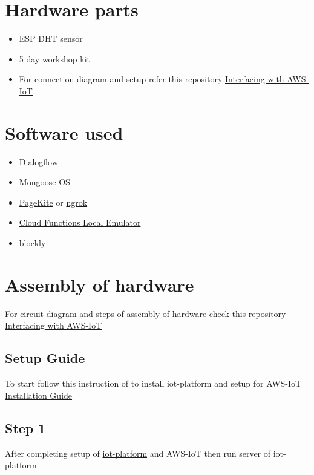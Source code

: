 \documentclass[a4paper,12pt,oneside]{book}
\begin{document}
\section{Hardware parts}
\begin{itemize}
  \item ESP DHT sensor
  \item 5 day workshop kit
  \item For connection diagram and setup refer this repository \href{https://github.com/sanamshakya/interfacing-AWS-IoT/}{Interfacing with AWS-IoT}
\end{itemize}

\section{Software used}
\begin{itemize}
  \item \href{dialogflow.com}{Dialogflow}
  \item \href{https://mongoose-os.com/}{Mongoose OS}
  \item \href{https://pagekite.net/}{PageKite} or \href{https://ngrok.com/}{ngrok}
  \item \href{https://cloud.google.com/functions/docs/emulator}{Cloud Functions Local Emulator}
  \item \href{https://developers.google.com/blockly/}{blockly}
\end{itemize}

\section{Assembly of hardware}
For circuit diagram and steps of assembly of hardware check this repository  \href{https://github.com/sanamshakya/interfacing-AWS-IoT/}{Interfacing with AWS-IoT}
\subsection*{Setup Guide}
To start follow this instruction of to install iot-platform and setup for AWS-IoT
\href{https://github.com/eYSIP-2018/IFTTT-and-NLP/wiki/Installation-Guide#setting-up-the-iot-platform}{Installation Guide}
\subsection*{Step 1}
After completing setup of \href{https://github.com/eYSIP-2018/IFTTT-and-NLP/tree/master/iot-platform}{iot-platform} and AWS-IoT then run server of iot-platform
\end{document}
